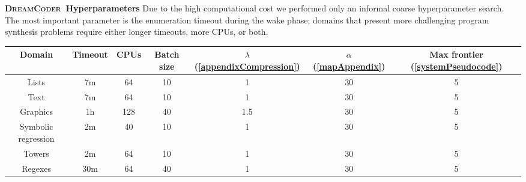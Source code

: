 \documentclass{article}
\newcommand{\system}{\textsc{DreamCoder}~}
\begin{document}
\noindent\textbf{\system Hyperparameters}
Due to the high computational cost we
performed only an informal coarse
hyperparameter search.
The most important parameter is
the enumeration timeout during the wake phase;
domains that present more challenging program synthesis
problems require either longer timeouts, more CPUs, or both.
\begin{center}
  \begin{tabular}{ccccccc}
    \toprule
    Domain&Timeout&CPUs&Batch size&$\lambda$ (\ref{appendixCompression})&$\alpha$ (\ref{mapAppendix})&Max frontier (\ref{systemPseudocode})\\\midrule
    Lists&7m&64&10&1&30&5\\
    Text&7m&64&10&1&30&5\\
    Graphics&1h&128&40&1.5&30&5\\
    Symbolic regression&2m & 40&10 & 1&30&5\\
    Towers& 2m& 64&10 & 1&30&5\\
    Regexes&30m & 64&40 & 1&30&5\\
    \bottomrule     
  \end{tabular}
\end{center}
\end{document}
